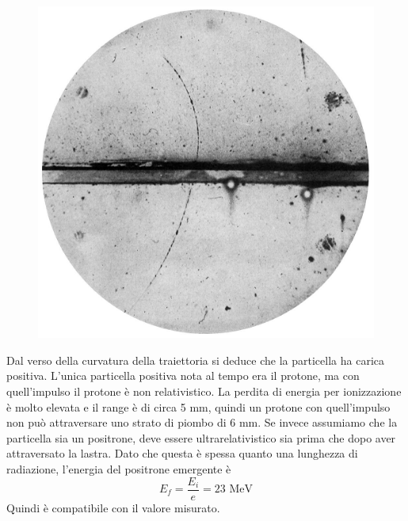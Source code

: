 \documentclass{article}
\begin{document}
\begin{enumerate}
\begin{figure}[h!]
		\includegraphics[scale=0.3]{anderson.jpg}
	\end{figure}
	Dal verso della curvatura della traiettoria si deduce che la particella ha carica positiva. L'unica particella positiva nota al tempo era il protone, ma con quell'impulso il protone è non relativistico. La perdita di energia per ionizzazione è molto elevata e il range è di circa 5 mm, quindi un protone con quell'impulso non può attraversare uno strato di piombo di 6 mm. Se invece assumiamo che la particella sia un positrone, deve essere ultrarelativistico sia prima che dopo aver attraversato la lastra. Dato che questa è spessa quanto una lunghezza di radiazione, l'energia del positrone emergente è
	\[E_f=\frac{E_i}{e}=23\textrm{ MeV}\]
	Quindi è compatibile con il valore misurato.
\end{enumerate}
\end{document}
